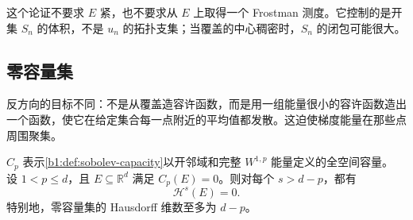 这个论证不要求 \(E\) 紧，也不要求从 \(E\) 上取得一个 Frostman 测度。它控制的是开集 \(S_n\) 的体积，不是 \(u_n\) 的拓扑支集；当覆盖的中心稠密时，\(S_n\) 的闭包可能很大。

\subsection{零容量集}
\label{b1:subsec:260302}

反方向的目标不同：不是从覆盖造容许函数，而是用一组能量很小的容许函数造出一个函数，使它在给定集合每一点附近的平均值都发散。这迫使梯度能量在那些点周围聚集。

\begin{theorem}\label{b1:thm:zero-capacity-hausdorff-dimension}
\(C_p\) 表示\cref{b1:def:sobolev-capacity}以开邻域和完整 \(W^{1,p}\) 能量定义的全空间容量。
设 \(1<p\leq d\)，且 \(E\subseteq\mathbb R^d\) 满足 \(C_p(E)=0\)。则对每个 \(s>d-p\)，都有
\[
 \mathcal H^s(E)=0.
\]
特别地，零容量集的 Hausdorff 维数至多为 \(d-p\)。
\end{theorem}
